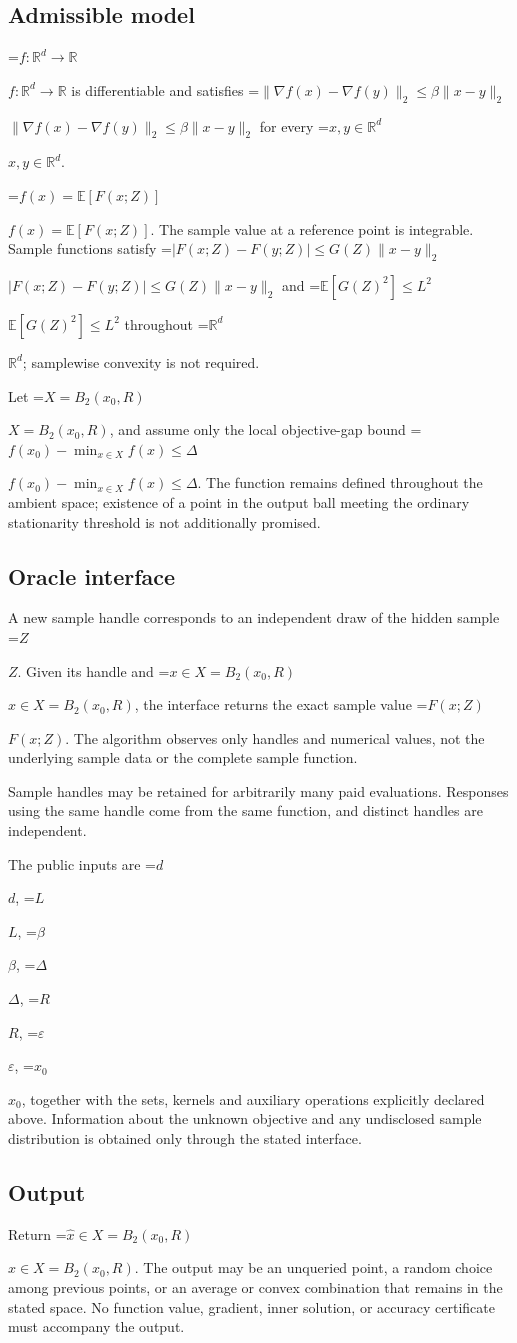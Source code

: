 \documentclass[10pt,a4paper]{article}
\newcommand{\AtlasMath}[1]{\par\begingroup\centering\setbox0=\hbox{$\displaystyle #1$}\ifdim\wd0>1.4\linewidth\typeout{ATLAS WIDE FORMULA: \the\wd0}\fi\ifdim\wd0>\linewidth\resizebox{\linewidth}{!}{\box0}\else\box0\fi\par\endgroup}
\newcommand{\AtlasInlineMath}[1]{\begingroup\setbox0=\hbox{$#1$}\ifdim\wd0>.4\linewidth\endgroup\AtlasMath{#1}\else\endgroup$#1$\fi}
\begin{document}
\subsection{Admissible model}
\AtlasInlineMath{f:\mathbb{R}^d\to\mathbb{R}} is differentiable and satisfies \AtlasInlineMath{\|\nabla f(x)-\nabla f(y)\|_2\le\beta\|x-y\|_2} for every \AtlasInlineMath{x,y\in\mathbb{R}^d}.

\AtlasInlineMath{f(x)=\mathbb{E}[F(x;Z)]}. The sample value at a reference point is integrable. Sample functions satisfy \AtlasInlineMath{|F(x;Z)-F(y;Z)|\le G(Z)\|x-y\|_2} and \AtlasInlineMath{\mathbb{E}[G(Z)^2]\le L^2} throughout \AtlasInlineMath{\mathbb{R}^d}; samplewise convexity is not required.

Let \AtlasInlineMath{X=B_2(x_0,R)}, and assume only the local objective-gap bound \AtlasInlineMath{f(x_0)-\min_{x\in X}f(x)\le\Delta}. The function remains defined throughout the ambient space; existence of a point in the output ball meeting the ordinary stationarity threshold is not additionally promised.

\subsection{Oracle interface}
A new sample handle corresponds to an independent draw of the hidden sample \AtlasInlineMath{Z}. Given its handle and \AtlasInlineMath{x\in X=B_2(x_0,R)}, the interface returns the exact sample value \AtlasInlineMath{F(x;Z)}. The algorithm observes only handles and numerical values, not the underlying sample data or the complete sample function.

Sample handles may be retained for arbitrarily many paid evaluations. Responses using the same handle come from the same function, and distinct handles are independent.

The public inputs are \AtlasInlineMath{d}, \AtlasInlineMath{L}, \AtlasInlineMath{\beta}, \AtlasInlineMath{\Delta}, \AtlasInlineMath{R}, \AtlasInlineMath{\varepsilon}, \AtlasInlineMath{x_0}, together with the sets, kernels and auxiliary operations explicitly declared above. Information about the unknown objective and any undisclosed sample distribution is obtained only through the stated interface.

\subsection{Output}
Return \AtlasInlineMath{\widehat{x}\in X=B_2(x_0,R)}. The output may be an unqueried point, a random choice among previous points, or an average or convex combination that remains in the stated space. No function value, gradient, inner solution, or accuracy certificate must accompany the output.
\end{document}
